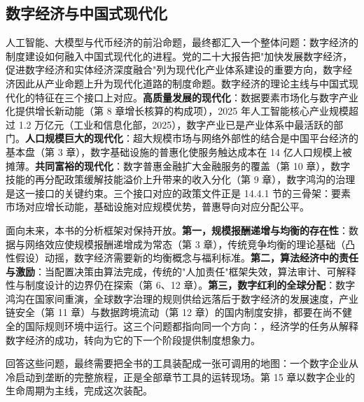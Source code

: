 \subsection{数字经济与中国式现代化}

人工智能、大模型与代币经济的前沿命题，最终都汇入一个整体问题：数字经济的制度建设如何融入中国式现代化的进程。党的二十大报告把"加快发展数字经济，促进数字经济和实体经济深度融合"列为现代化产业体系建设的重要方向，数字经济因此从产业命题上升为现代化道路的制度命题。数字经济的理论主线与中国式现代化的特征在三个接口上对应。\textbf{高质量发展的现代化}：数据要素市场化与数字产业化提供增长新动能（第 8 章增长核算的构成项），2025 年人工智能核心产业规模超过 1.2 万亿元（工业和信息化部，2025），数字产业已是产业体系中最活跃的部门。\textbf{人口规模巨大的现代化}：超大规模市场与网络外部性的结合是中国平台经济的基本盘（第 3 章），数字基础设施的普惠化使服务触达成本在 14 亿人口规模上被摊薄。\textbf{共同富裕的现代化}：数字普惠金融扩大金融服务的覆盖（第 10 章），数字技能的再分配政策缓解技能溢价上升带来的收入分化（第 9 章），数字鸿沟的治理是这一接口的关键约束。三个接口对应的政策文件正是 14.4.1 节的三骨架：要素市场对应增长动能，基础设施对应规模优势，普惠导向对应分配公平。

面向未来，本书的分析框架对保持开放。\textbf{第一，规模报酬递增与均衡的存在性}：数据与网络效应使规模报酬递增成为常态（第 3 章），传统竞争均衡的理论基础（凸性假设）动摇，数字经济需要新的均衡概念与福利标准。\textbf{第二，算法经济中的责任与激励}：当配置决策由算法完成，传统的"人加责任"框架失效，算法审计、可解释性与制度设计的边界仍在探索（第 6、12 章）。\textbf{第三，数字红利的全球分配}：数字鸿沟在国家间重演，全球数字治理的规则供给远落后于数字经济的发展速度，产业链安全（第 11 章）与数据跨境流动（第 12 章）的国内制度安排，都要在尚不健全的国际规则环境中运行。这三个问题都指向同一个方向：，经济学的任务从解释数字经济的成功，转向为它的下一个阶段提供制度想象力。

回答这些问题，最终需要把全书的工具装配成一张可调用的地图：一个数字企业从冷启动到垄断的完整旅程，正是全部章节工具的运转现场。第 15 章以数字企业的生命周期为主线，完成这次装配。

